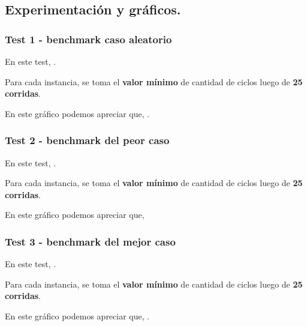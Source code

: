 \subsection{Experimentación y gráficos.}

\vspace*{0.3cm}

\subsubsection{Test 1 - benchmark caso aleatorio}

En este test, .
 
Para cada instancia, se toma el \textbf{valor mínimo} de cantidad de ciclos luego de \textbf{25 corridas}. 

\vspace*{0.5cm}


\vspace*{0.5cm}

En este gráfico podemos apreciar que, .


\newpage


\subsubsection{Test 2 - benchmark del peor caso}

En este test, .

Para cada instancia, se toma el \textbf{valor mínimo} de cantidad de ciclos luego de \textbf{25 corridas}.

\vspace*{0.5cm}


\vspace*{0.5cm}

En este gráfico podemos apreciar que, 


\newpage


\subsubsection{Test 3 - benchmark del mejor caso}

En este test, .

Para cada instancia, se toma el \textbf{valor mínimo} de cantidad de ciclos luego de \textbf{25 corridas}.




En este gráfico podemos apreciar que, .
